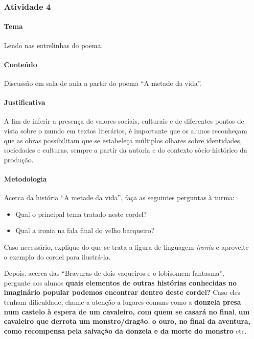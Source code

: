 \documentclass[11pt]{extarticle}
\begin{document}
\subsubsection{Atividade 4}


\paragraph{Tema} Lendo nas entrelinhas do poema.

\paragraph{Conteúdo} Discussão em sala de aula a partir do poema ``A metade da vida''.

\paragraph{Justificativa} A fim de inferir a presença de valores sociais, 
culturais e de diferentes pontos de vista sobre o mundo em textos literários,
é importante que os alunos reconheçam que as obras possibilitam 
que se estabeleça múltiplos olhares sobre identidades, sociedades e culturas, 
sempre a partir da autoria e do contexto sócio-histórico da produção.

\paragraph{Metodologia} Acerca da história ``A metade da vida'', faça as seguintes perguntas
à turma:

\begin{itemize}
\item Qual o principal tema tratado neste cordel? 
\item Qual a ironia na fala final do velho barqueiro?
\end{itemize}

Caso necessário, explique do que se trata a figura de linguagem \textit{ironia} e 
aproveite o exemplo do cordel para ilustrá-la.

Depois, acerca das ``Bravuras de dois vaqueiros e o lobisomem fantasma'', 
pergunte aos alunos \textbf{quais elementos de outras histórias conhecidas 
no imaginário popular podemos encontrar dentro deste cordel?} Caso eles 
tenham dificuldade, chame a atenção a lugares-comuns  como a \textbf{donzela presa 
num castelo à espera de um cavaleiro, com quem se casará no final}, \textbf{um cavaleiro 
que derrota um monstro/dragão}, \textbf{o ouro, no final da aventura, como recompensa pela salvação da donzela 
e da morte do monstro} etc.
\end{document}
